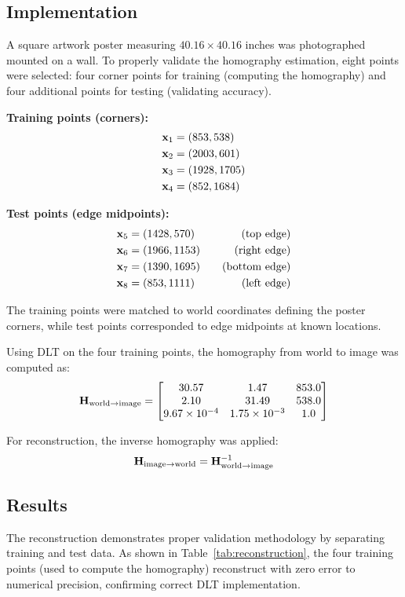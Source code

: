 \subsection{Implementation}
A square artwork poster measuring $40.16 \times 40.16$ inches was photographed mounted on a wall. To properly validate the homography estimation, eight points were selected: four corner points for training (computing the homography) and four additional points for testing (validating accuracy).

\textbf{Training points (corners):}
\begin{align*}
    \mathbf{x}_1 &= (853, 538) \\
    \mathbf{x}_2 &= (2003, 601) \\
    \mathbf{x}_3 &= (1928, 1705) \\
    \mathbf{x}_4 &= (852, 1684)
\end{align*}

\textbf{Test points (edge midpoints):}
\begin{align*}
    \mathbf{x}_5 &= (1428, 570) \quad &\text{(top edge)} \\
    \mathbf{x}_6 &= (1966, 1153) \quad &\text{(right edge)} \\
    \mathbf{x}_7 &= (1390, 1695) \quad &\text{(bottom edge)} \\
    \mathbf{x}_8 &= (853, 1111) \quad &\text{(left edge)}
\end{align*}

The training points were matched to world coordinates defining the poster corners, while test points corresponded to edge midpoints at known locations.

Using DLT on the four training points, the homography from world to image was computed as:
\begin{equation}
    \mathbf{H}_{\text{world} \to \text{image}} = \begin{bmatrix}
    30.57 & 1.47 & 853.0 \\
    2.10 & 31.49 & 538.0 \\
    9.67 \times 10^{-4} & 1.75 \times 10^{-3} & 1.0
    \end{bmatrix}
\end{equation}

For reconstruction, the inverse homography was applied:
\begin{equation}
    \mathbf{H}_{\text{image} \to \text{world}} = \mathbf{H}^{-1}_{\text{world} \to \text{image}}
\end{equation}

\subsection{Results}
The reconstruction demonstrates proper validation methodology by separating training and test data. As shown in Table~\ref{tab:reconstruction}, the four training points (used to compute the homography) reconstruct with zero error to numerical precision, confirming correct DLT implementation. 

